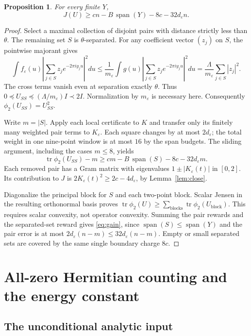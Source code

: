 \documentclass[11pt,a4paper]{article}
\newtheorem{proposition}[theorem]{Proposition}
\theoremstyle{remark}
\DeclareMathOperator{\tr}{tr}
\begin{document}
\begin{proposition}\label{prop:lossless}
For every finite $Y$,
\begin{equation}\label{eq:gain}
 J(U)\ge cn-B\,\operatorname{span}(Y)-8c-32d_\varepsilon n.
\end{equation}
\end{proposition}
\begin{proof}
Select a maximal collection of disjoint pairs with distance
strictly less than $\theta$. The remaining set $S$ is
$\theta$-separated. For any coefficient vector $(z_j)$ on $S$,
the pointwise majorant gives
\[
 \int f_\varepsilon(u)\left|\sum_{j\in S}z_je^{-2\pi iy_ju}\right|^2du
 \le\frac1{m_\varepsilon}
 \int g(u)\left|\sum_{j\in S}z_je^{-2\pi iy_ju}\right|^2du
 =\frac{\Lambda}{m_\varepsilon}\sum_{j\in S}|z_j|^2 .
\]
The cross terms vanish even at separation exactly $\theta$.
Thus $0\preceq U_{SS}\preceq(\Lambda/m_\varepsilon)I\prec2I$.
Normalization by $m_\varepsilon$ is necessary here.
Consequently $\phi_2(U_{SS})=U_{SS}^2$.

Write $m=|S|$. Apply each local certificate to $K$ and transfer
only its finitely many weighted pair terms to $K_\varepsilon$.
Each square changes by at most $2d_\varepsilon$; the total
weight in one nine-point window is at most $16$ by the span budgets.
The sliding argument, including the cases $m\le8$, yields
\[
 \tr\phi_2(U_{SS})-m
 \ge cm-B\,\operatorname{span}(S)-8c-32d_\varepsilon m .
\]
Each removed pair has a Gram matrix with eigenvalues
$1\pm|K_\varepsilon(t)|$ in $[0,2]$.
Its contribution to $J$ is
$2K_\varepsilon(t)^2\ge2c-4d_\varepsilon$, by
Lemma~\ref{lem:close}.

Diagonalize the principal block for $S$ and each two-point block.
Scalar Jensen in the resulting orthonormal basis proves
$\tr\phi_2(U)\ge\sum_{\text{blocks}}\tr\phi_2(U_{\text{block}})$.
This requires scalar convexity, not operator convexity.
Summing the pair rewards and the separated-set reward gives
\eqref{eq:gain}, since $\operatorname{span}(S)\le
\operatorname{span}(Y)$ and the pair error is at most
$2d_\varepsilon(n-m)\le32d_\varepsilon(n-m)$.
Empty or small separated sets are covered by the same single
boundary charge $8c$.
\end{proof}

\section{All-zero Hermitian counting and the energy constant}

\subsection{The unconditional analytic input}
\end{document}
